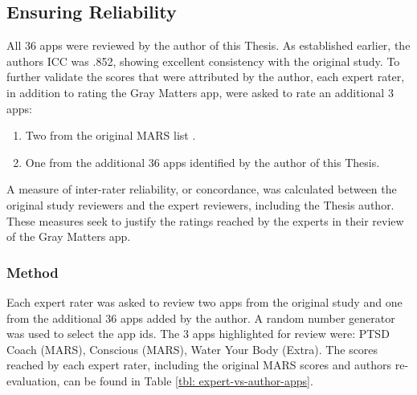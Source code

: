 \subsection{Ensuring Reliability}
All 36 apps were reviewed by the author of this Thesis. As established earlier, the authors ICC was .852, showing excellent consistency with the original study. To further validate the scores that were attributed by the author, each expert rater, in addition to rating the Gray Matters app, were asked to rate an additional 3 apps:
\begin{enumerate}[noitemsep,topsep=0pt]
\item Two from the original MARS list \cite{Stoyanov2015}.
\item One from the additional 36 apps identified by the author of this Thesis.
\end{enumerate} 

A measure of inter-rater reliability, or concordance, was calculated between the original study reviewers and the expert reviewers, including the Thesis author. These measures seek to justify the ratings reached by the experts in their review of the Gray Matters app.

\subsubsection{Method}
Each expert rater was asked to review two apps from the original study \cite{Stoyanov2015} and one from the additional 36 apps added by the author. A random number generator was used to select the app ids. The 3 apps highlighted for review were: PTSD Coach (MARS), Conscious (MARS), Water Your Body (Extra). The scores reached by each expert rater, including the original MARS scores and authors re-evaluation, can be found in Table \ref{tbl: expert-vs-author-apps}.

\begin{table}[h]
\centering
\caption{MARS scores attributed by each expert rater, the original study, and the author.}
\label{tbl: expert-vs-author-apps}
\end{table}

